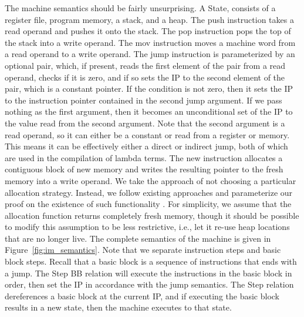 The machine semantics should be fairly unsurprising. A State, consists of a
register file, program memory, a stack, and a heap. The push instruction takes a
read operand and pushes it onto the stack. The pop instruction pops the
top of the stack into a write operand. The mov instruction moves a machine word
from a read operand to a write operand. The jump instruction is parameterized by
an optional pair, which, if present, reads the first element of the pair from a
read operand, checks if it is zero, and if so sets the IP to the second element
of the pair, which is a constant pointer. If the condition is not zero, then it
sets the IP to the instruction pointer contained in the second jump argument. If
we pass nothing as the first argument, then it becomes an unconditional set of
the IP to the value read from the second argument.  Note that the second
argument is a read operand, so it can either be a constant or read from a register
or memory. This means it can be effectively either a direct or indirect jump,
both of which are used in the compilation of lambda terms. The new instruction
allocates a contiguous block of new memory and writes the resulting pointer to
the fresh memory into a write operand. We take the approach of not choosing a
particular allocation strategy. Instead, we follow existing approaches and
parameterize our proof on the existence of such functionality
\cite{chlipala2007certified}. For simplicity, we assume that the allocation
function returns completely fresh memory, though it should be possible to modify
this assumption to be less restrictive, i.e., let it re-use heap locations that
are no longer live. The complete semantics of the machine is given in
Figure~\ref{fig:im_semantics}.  Note that we separate instruction steps and
basic block steps. Recall that a basic block is a sequence of instructions that
ends with a jump. The Step BB relation will execute the instructions
in the basic block in order, then set the IP in accordance with the
jump semantics. The Step relation dereferences a basic block at the current IP,
and if executing the basic block results in a new state, then the machine
executes to that state. 


